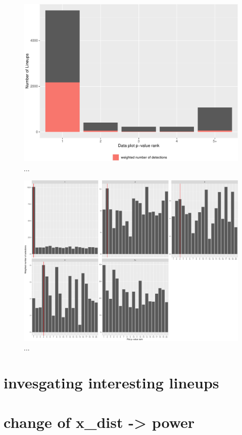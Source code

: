 \documentclass[]{interact}
\theoremstyle{plain}%
\theoremstyle{definition}
\theoremstyle{remark}
\begin{document}
\begin{figure}

{\centering \includegraphics[width=1\linewidth]{paper_comparison_files/figure-latex/dataplotsel-1} 

}

\caption{...}\label{fig:dataplotsel}
\end{figure}

\begin{figure}

{\centering \includegraphics[width=1\linewidth]{paper_comparison_files/figure-latex/dadtaplotselfacet-1} 

}

\caption{...}\label{fig:dadtaplotselfacet}
\end{figure}

\hypertarget{invesgating-interesting-lineups}{%
\section{invesgating interesting
lineups}\label{invesgating-interesting-lineups}}

\hypertarget{change-of-x_dist---power}{%
\section{change of x\_dist -\textgreater{}
power}\label{change-of-x_dist---power}}



\end{document}
